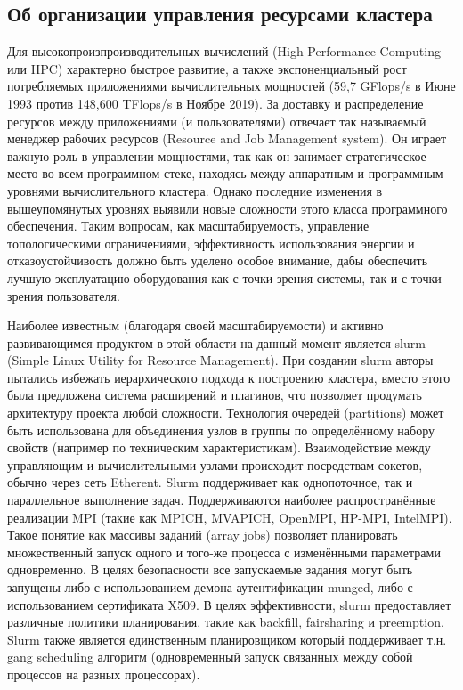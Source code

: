 \documentclass[a4paper]{extarticle}
\begin{document}
\subsection*{Об организации управления ресурсами кластера}

Для высокопроизпроизводительных вычислений (High Performance Computing или HPC) характерно быстрое развитие, а также экспоненциальный рост потребляемых приложениями вычислительных мощностей (59,7 GFlops/s в Июне 1993 против 148,600 TFlops/s в Ноябре 2019\cite{top500}). За доставку и распределение ресурсов между приложениями (и пользователями) отвечает так называемый менеджер рабочих ресурсов (Resource and Job Management system).  Он играет важную роль в управлении мощностями, так как он занимает стратегическое место во всем программном стеке, находясь между аппаратным
и программным уровнями вычислительного кластера. Однако последние изменения в вышеупомянутых уровнях выявили новые сложности этого класса программного обеспечения. Таким вопросам, как масштабируемость, управление топологическими ограничениями, эффективность использования энергии и отказоустойчивость должно быть уделено особое внимание, дабы обеспечить лучшую эксплуатацию оборудования как с точки зрения системы, так и с точки зрения пользователя.

Наиболее известным (благодаря своей масштабируемости) и активно развивающимся продуктом в этой области на данный момент является slurm (Simple Linux Utility for Resource Management).  При создании slurm авторы пытались избежать иерархического подхода к построению кластера, вместо этого была предложена система расширений и плагинов, что позволяет продумать архитектуру проекта любой сложности. Технология очередей  (partitions) может быть использована для объединения узлов в группы по определённому набору свойств (например по техническим характеристикам). Взаимодействие между управляющим и вычислительными узлами  происходит посредствам сокетов, обычно через сеть Etherent. Slurm поддерживает как однопоточное, так и параллельное выполнение задач. Поддерживаются наиболее распространённые реализации MPI (такие как MPICH, MVAPICH, OpenMPI, HP-MPI, IntelMPI). Такое понятие как массивы заданий (array jobs) позволяет планировать множественный запуск одного и того-же процесса с изменёнными параметрами одновременно. В целях безопасности все запускаемые задания могут быть запущены либо с использованием демона аутентификации munged, либо с использованием сертификата X509. В целях эффективности, slurm предоставляет различные политики планирования, такие как backfill, fairsharing и preemption. Slurm также является единственным планировщиком который поддерживает т.н. gang scheduling алгоритм (одновременный запуск связанных между собой процессов на разных процессорах).
\end{document}
